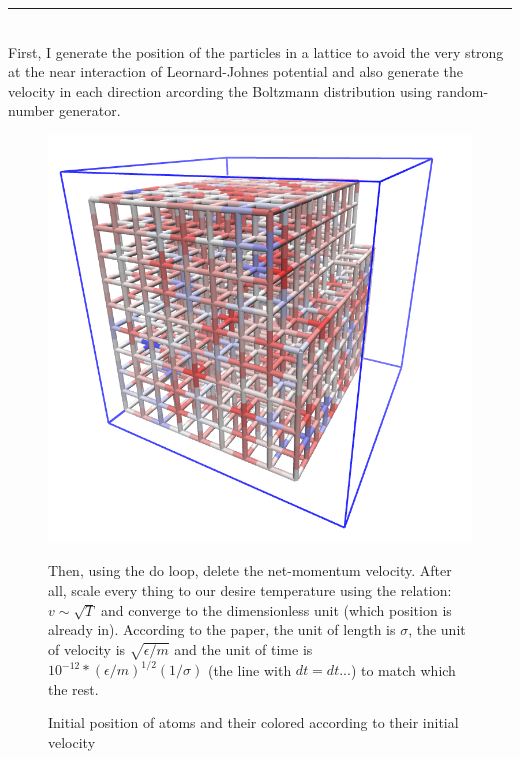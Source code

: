 \documentclass[a4paper]{article}
\begin{document}
\rule{\textwidth}{1pt}\\\null
\quad First, I generate the position of the particles in a lattice to avoid the very strong at the near interaction of Leornard-Johnes potential and also generate the velocity in each direction arcording the Boltzmann distribution using random-number generator.
\begin{figure}[h]
\begin{center}
	\includegraphics[width = 0.5\linewidth]{Images/Lattice.png}
\caption{Initial position of atoms and their colored according to their initial velocity}
\end{center}
Then, using the do loop, delete the net-momentum velocity. After all, scale every thing to our desire temperature using the relation: \(v \sim \sqrt{T}\) and converge to the dimensionless unit (which position is already in). According to the paper, the unit of length is \(\sigma\), the unit of velocity is \(\sqrt{\epsilon/m}\) and the unit of time is \(10^{-12}*(\epsilon/m)^{1/2}(1/\sigma)\) (the line with \(dt = dt...\)) to match which the rest.
\end{figure}
\end{document}
